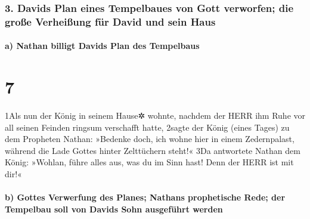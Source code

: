 \hypertarget{davids-plan-eines-tempelbaues-von-gott-verworfen-die-grouxdfe-verheiuxdfung-fuxfcr-david-und-sein-haus}{%
\subsubsection{3. Davids Plan eines Tempelbaues von Gott verworfen; die
große Verheißung für David und sein
Haus}\label{davids-plan-eines-tempelbaues-von-gott-verworfen-die-grouxdfe-verheiuxdfung-fuxfcr-david-und-sein-haus}}

\hypertarget{a-nathan-billigt-davids-plan-des-tempelbaus}{%
\paragraph{a) Nathan billigt Davids Plan des
Tempelbaus}\label{a-nathan-billigt-davids-plan-des-tempelbaus}}

\hypertarget{section-6}{%
\section{7}\label{section-6}}

1Als nun der König in seinem Hause✲ wohnte, nachdem der HERR ihm Ruhe
vor all seinen Feinden ringsum verschafft hatte, 2sagte der König (eines
Tages) zu dem Propheten Nathan: »Bedenke doch, ich wohne hier in einem
Zedernpalast, während die Lade Gottes hinter Zelttüchern steht!« 3Da
antwortete Nathan dem König: »Wohlan, führe alles aus, was du im Sinn
hast! Denn der HERR ist mit dir!«

\hypertarget{b-gottes-verwerfung-des-planes-nathans-prophetische-rede-der-tempelbau-soll-von-davids-sohn-ausgefuxfchrt-werden}{%
\paragraph{b) Gottes Verwerfung des Planes; Nathans prophetische Rede;
der Tempelbau soll von Davids Sohn ausgeführt
werden}\label{b-gottes-verwerfung-des-planes-nathans-prophetische-rede-der-tempelbau-soll-von-davids-sohn-ausgefuxfchrt-werden}}

